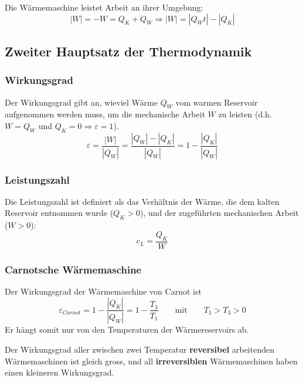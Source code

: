 \documentclass[11pt]{article}
\begin{document}
Die W{\"a}rmemaschine leistet Arbeit an ihrer Umgebung:
\begin{equation*}
	|W| = -W = Q_K + Q_W \Rightarrow |W| = |Q_Wt| - |Q_K|
\end{equation*}

\subsection{Zweiter Hauptsatz der Thermodynamik}

\subsubsection{Wirkungsgrad}

Der Wirkungsgrad gibt an, wieviel W{\"a}rme $Q_W$ vom warmen Reservoir aufgenommen werden muss, um die mechanische Arbeit $W$ zu leisten (d.h. $W = Q_W$ und $Q_K = 0 \Rightarrow \varepsilon = 1$).
\begin{equation*}
	\varepsilon = \frac{|W|}{|Q_W|} = \frac{|Q_W|-|Q_K|}{|Q_W|} = 1 - \frac{|Q_K|}{|Q_W|}
\end{equation*}

\subsubsection{Leistungszahl}
Die Leistungszahl ist definiert als das Verh{\"a}ltnis der W{\"a}rme, die dem kalten Reservoir entnommen wurde ($Q_K > 0$), und der zugef{\"u}hrten mechanischen Arbeit ($W > 0$):
\begin{equation*}
	c_L = \frac{Q_K}{W}
\end{equation*}

\subsubsection{Carnotsche W{\"a}rmemaschine}

Der Wirkungsgrad der W{\"a}rmemaschine von Carnot ist
\begin{equation*}
	\varepsilon_{Carnot} = 1 - \frac{|Q_K|}{|Q_W|} = 1 - \frac{T_3}{T_1} \qquad\text{mit}\qquad T_1 > T_3 > 0
\end{equation*}
Er h{\"a}ngt somit nur von den Temperaturen der W{\"a}rmereservoirs ab. \newline

Der Wirkungsgrad aller zwischen zwei Temperatur \textbf{reversibel} arbeitenden W{\"a}rmemaschinen ist gleich gross, und all \textbf{irreversiblen} W{\"a}rmemaschinen haben einen kleineren Wirkungsgrad. \newline
\end{document}
